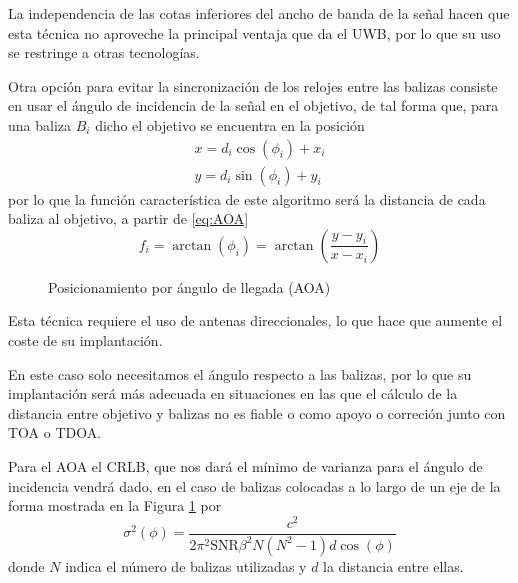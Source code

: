 La independencia de las cotas inferiores del ancho de banda de la señal hacen que esta técnica no aproveche la principal ventaja que da el UWB, por lo que su uso se restringe a otras tecnologías.


Otra opción para evitar la sincronización de los relojes entre las balizas consiste en usar el ángulo de incidencia de la señal en el objetivo, de tal forma que, para una baliza $B_i$ dicho el objetivo se encuentra en la posición
\begin{equation}
    \label{eq:AOA}
    \begin{aligned}
        x = d_i \cos(\phi_i) + x_i \\        
        y = d_i \sin(\phi_i) + y_i         
    \end{aligned}
\end{equation}
por lo que la función característica de este algoritmo será la distancia de cada baliza al objetivo, a partir de \eqref{eq:AOA}
\begin{equation}
    f_i = \arctan(\phi_i) = \arctan(\frac{y-y_i}{x-x_i})
\end{equation}

\begin{figure}[H]
    \centering
    \def\svgwidth{0.6\linewidth}
	
    \caption{Posicionamiento por ángulo de llegada (AOA)}
    \label{fig:AOA}
\end{figure}
Esta técnica requiere el uso de antenas direccionales, lo que hace que aumente el coste de su implantación.

En este caso solo necesitamos el ángulo respecto a las balizas, por lo que su implantación será más adecuada en situaciones en las que el cálculo de la distancia entre objetivo y balizas no es fiable o como apoyo o correción junto con TOA o TDOA.


Para el AOA el CRLB, que nos dará el mínimo de varianza para el ángulo de incidencia vendrá dado, en el caso de balizas colocadas a lo largo de un eje de la forma mostrada en la Figura \ref{fig:AOA} por \cite{Xbook, shim2018}
\begin{equation}
    \sigma^2(\phi) = \frac{c^2}{2\pi^2 \text{SNR} \beta^2 N(N^2-1)d\cos(\phi)}
\end{equation}
donde $N$ indica el número de balizas utilizadas y $d$ la distancia entre ellas.

